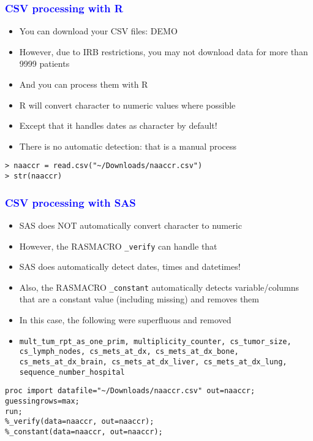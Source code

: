 \documentclass[11pt,pdftex,dvipsnames,usenames]{beamer}
\begin{document}
\begin{frame}[fragile]\frametitle{\bf\textcolor{blue}{CSV processing with R}}
\begin{itemize}
\item You can download your CSV files: DEMO
\item However, due to IRB restrictions, you may not download data
for more than 9999 patients
\item And you can process them with R
\item R will convert character to numeric values where possible
\item Except that it handles dates as character by default!
\item There is no automatic detection: that is a manual process
\end{itemize}
\begin{verbatim}
> naaccr = read.csv("~/Downloads/naaccr.csv")
> str(naaccr)
\end{verbatim}

\end{frame}

\begin{frame}[fragile]\frametitle{\bf\textcolor{blue}{CSV processing with SAS}}
\begin{itemize}
\item SAS does NOT automatically convert character to numeric
\item However, the RASMACRO \texttt{\_verify} can handle that
\item SAS does automatically detect dates, times and datetimes!
\item Also, the RASMACRO \texttt{\_constant} automatically detects
variable/columns that are a constant value (including missing) and
removes them
\item In this case, the following were superfluous and removed
\item \texttt{mult\_tum\_rpt\_as\_one\_prim, multiplicity\_counter, 
cs\_tumor\_size, cs\_lymph\_nodes, cs\_mets\_at\_dx, cs\_mets\_at\_dx\_bone, 
cs\_mets\_at\_dx\_brain, cs\_mets\_at\_dx\_liver, cs\_mets\_at\_dx\_lung, 
sequence\_number\_hospital}
\end{itemize}
\begin{verbatim}
proc import datafile="~/Downloads/naaccr.csv" out=naaccr;
guessingrows=max;
run;
%_verify(data=naaccr, out=naaccr);
%_constant(data=naaccr, out=naaccr);
\end{verbatim}

\end{frame}
\end{document}
